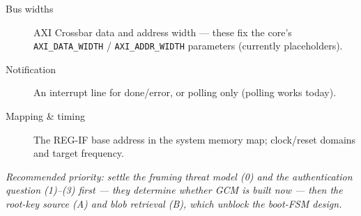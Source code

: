 \documentclass[11pt,a4paper]{article}
\newcommand{\code}[1]{\texttt{#1}}
\begin{document}
\begin{description}
  \item[Bus widths] AXI Crossbar data and address width --- these fix the core's
    \code{AXI\_DATA\_WIDTH} / \code{AXI\_ADDR\_WIDTH} parameters (currently placeholders).
  \item[Notification] An interrupt line for done/error, or polling only (polling works today).
  \item[Mapping \& timing] The REG-IF base address in the system memory map; clock/reset domains
    and target frequency.
\end{description}

\vspace{0.4cm}
\noindent\textit{Recommended priority: settle the framing threat model (0) and the authentication
question (1)--(3) first --- they determine whether GCM is built now --- then the root-key source (A)
and blob retrieval (B), which unblock the boot-FSM design.}
\end{document}

